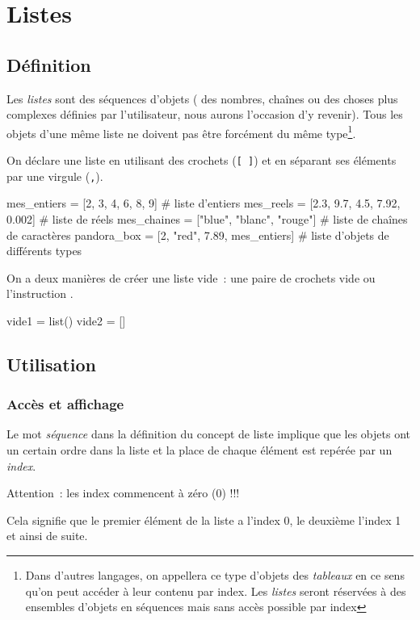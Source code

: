 
\chapter{Listes}
\label{python:listes}

\section{Définition}
Les \textit{listes} sont des séquences d'objets (\cad{} des nombres, chaînes ou des choses plus complexes définies par l'utilisateur, nous aurons l'occasion d'y revenir). Tous les objets d'une même liste ne doivent pas être forcément du même type\footnote{Dans d'autres langages, on appellera ce type d'objets des \textit{tableaux} en ce sens qu'on peut accéder à leur contenu par index. Les \textit{listes} seront réservées à des ensembles d'objets en séquences mais sans accès possible par index}.

On déclare une liste en utilisant des crochets (\texttt{[ ]}) et en séparant ses éléments par une virgule (\texttt{,}).
\begin{pythoncode}
mes_entiers = [2, 3, 4, 6, 8, 9]             # liste d'entiers
mes_reels = [2.3, 9.7, 4.5, 7.92, 0.002]     # liste de réels
mes_chaines = ["blue", "blanc", "rouge"]     # liste de chaînes de caractères
pandora_box = [2, "red", 7.89, mes_entiers]  # liste d'objets de différents types
\end{pythoncode}
On a deux manières de créer une liste vide~: une paire de crochets vide ou l'instruction .
\begin{pythoncode}
vide1 = list()
vide2 = []
\end{pythoncode}

\section{Utilisation}
\subsection{Accès et affichage}
 Le mot \textit{séquence} dans la définition du concept de liste implique que les objets ont un certain ordre dans la liste et la place de chaque élément est repérée par un \textit{index}.

 \begin{remarque}
  Attention~: les index commencent à zéro (0) !\!!\!!

  Cela signifie que le premier élément de la liste a l'index 0, le deuxième l'index 1 et ainsi de suite.
  \end{remarque}

